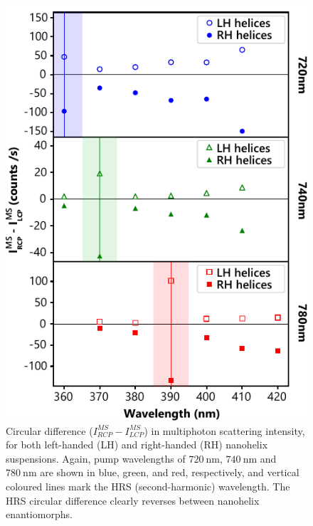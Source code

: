 \begin{figure}[htb!]	
    \centering	
    \includegraphics[scale=1]{./figures/results/HRS/hrs_cd_data.pdf}
    \caption{\label{fig:results:HRS:hrs_cd_data}
    Circular difference ($I_{RCP}^{MS}-I_{LCP}^{MS}$) in multiphoton scattering intensity, for both left-handed (LH) and right-handed (RH) nanohelix suspensions. Again, pump wavelengths of $\SI{720}{\nano\m}$, $\SI{740}{\nano\m}$ and $\SI{780}{\nano\m}$ are shown in blue, green, and red, respectively, and vertical coloured lines mark the HRS (second-harmonic) wavelength. The HRS circular difference clearly reverses between nanohelix enantiomorphs.}	
\end{figure}

